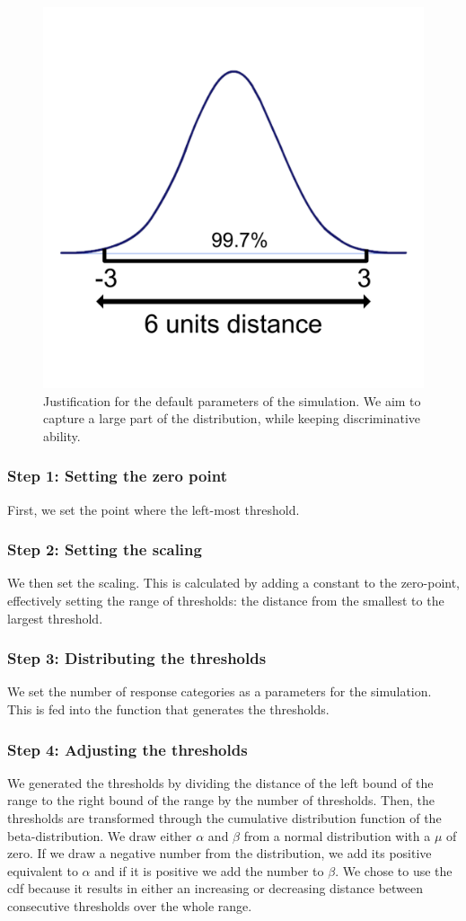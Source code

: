 \documentclass[titlepage, a4paper, 11pt]{article}
\begin{document}
\begin{figure}
    \centering
    \includegraphics[width=0.25\linewidth]{Plots/justification_for_chosen_distances.pdf}
    \caption{Justification for the default parameters of the simulation. We aim to capture a large part of the distribution, while keeping discriminative ability.}
    \label{fig:diagram_five}
\end{figure}

\subsubsection{\textbf{Step 1:} Setting the zero point}
First, we set the point where the left-most threshold. 

\subsubsection{\textbf{Step 2:} Setting the scaling}
We then set the scaling. This is calculated by adding a constant to the zero-point, effectively setting the range of thresholds: the distance from the smallest to the largest threshold.

\subsubsection{\textbf{Step 3:} Distributing the thresholds}
We set the number of response categories as a parameters for the simulation. This is fed into the function that generates the thresholds.

\subsubsection{\textbf{Step 4:} Adjusting the thresholds}
We generated the thresholds by dividing the distance of the left bound of the range to the right bound of the range by the number of thresholds. Then, the thresholds are transformed through the cumulative distribution function of the beta-distribution. We draw either $\alpha$ and $\beta$ from a normal distribution with a $\mu$ of zero. If we draw a negative number from the distribution, we add its positive equivalent to $\alpha$ and if it is positive we add the number to $\beta$. We chose to use the cdf because it results in either an increasing or decreasing distance between consecutive thresholds over the whole range.
\end{document}
